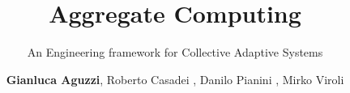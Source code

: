 

\title{
  \textbf{Aggregate Computing}
}
\subtitle{
  An Engineering framework for Collective Adaptive Systems   
}
\author[G.Aguzzi]{
  \textbf{Gianluca Aguzzi}, Roberto Casadei , Danilo Pianini , Mirko Viroli 
}
\talk{}
